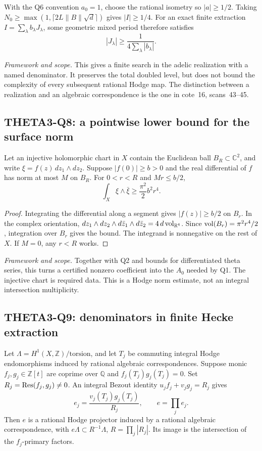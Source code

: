 \documentclass[11pt]{article}
\newcommand{\Q}{\mathbb Q}\newcommand{\C}{\mathbb C}\newcommand{\Z}{\mathbb Z}\newcommand{\R}{\mathbb R}\newcommand{\A}{\mathbb A}\newcommand{\OO}{\mathcal O}
\newcommand{\framework}[1]{\par\smallskip\noindent\textit{Framework and scope.} #1\par}
\theoremstyle{definition}\newtheorem{definition}[theorem]{Definition}\newtheorem{remark}[theorem]{Remark}
\begin{document}
With the Q6 convention $a_0=1$, choose the rational isometry so $|a|\geq1/2$. Taking
$N_0\geq\max(1,\lceil2L\|B\|\sqrt d\rceil)$ gives $|I|\geq1/4$. For an exact finite extraction $I=\sum_\lambda b_\lambda J_\lambda$, some geometric mixed period therefore satisfies
\begin{equation}\label{eq:quarter}
 |J_\lambda|\geq\frac1{4\sum_\lambda|b_\lambda|}.
\end{equation}
\framework{This gives a finite search in the adelic realization with a named denominator. It preserves the total doubled level, but does not bound the complexity of every subsequent rational Hodge map. The distinction between a realization and an algebraic correspondence is the one in cote~16, scans~43--45.}

\subsection{THETA3-Q8: a pointwise lower bound for the surface norm}\label{Q8}
Let an injective holomorphic chart in $X$ contain the Euclidean ball $B_R\subset\C^2$, and write
$\xi=f(z)\,dz_1\wedge dz_2$. Suppose $|f(0)|\geq b>0$ and the real differential of $f$ has norm at most $M$ on $B_R$. For $0<r<R$ and $Mr\leq b/2$,
\begin{equation}\label{eq:local-norm}
 \int_X\xi\wedge\bar\xi\geq\frac{\pi^2}{2}b^2r^4.
\end{equation}
\begin{proof}
Integrating the differential along a segment gives $|f(z)|\geq b/2$ on $B_r$. In the complex orientation,
$dz_1\wedge dz_2\wedge d\bar z_1\wedge d\bar z_2=4\,d\vol_{\R^4}$.
Since $\operatorname{vol}(B_r)=\pi^2r^4/2$, integration over $B_r$ gives the bound. The integrand is nonnegative on the rest of $X$. If $M=0$, any $r<R$ works.
\end{proof}
\framework{Together with Q2 and bounds for differentiated theta series, this turns a certified nonzero coefficient into the $A_0$ needed by Q1. The injective chart is required data. This is a Hodge norm estimate, not an integral intersection multiplicity.}

\subsection{THETA3-Q9: denominators in finite Hecke extraction}\label{Q9}
Let $\Lambda=H^1(X,\Z)/\mathrm{torsion}$, and let $T_j$ be commuting integral Hodge endomorphisms induced by rational algebraic correspondences. Suppose monic $f_j,g_j\in\Z[t]$ are coprime over $\Q$ and
$f_j(T_j)g_j(T_j)=0$. Set $R_j=\operatorname{Res}(f_j,g_j)\ne0$. An integral Bezout identity
$u_jf_j+v_jg_j=R_j$ gives
\[
 e_j=\frac{v_j(T_j)g_j(T_j)}{R_j},\qquad e=\prod_j e_j.
\]
Then $e$ is a rational Hodge projector induced by a rational algebraic correspondence, with
$e\Lambda\subset R^{-1}\Lambda$, $R=\prod_j|R_j|$. Its image is the intersection of the $f_j$-primary factors.
\end{document}
